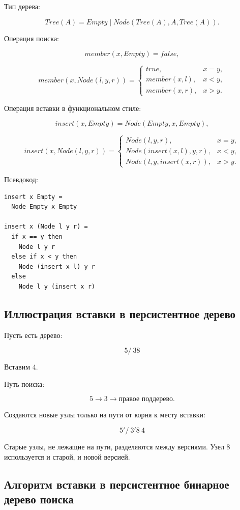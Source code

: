 \documentclass[12pt,a4paper]{article}
\begin{document}
Тип дерева:

\[
Tree(A) = Empty \mid Node(Tree(A), A, Tree(A)).
\]

Операция поиска:

\[
member(x, Empty) = false,
\]

\[
member(x, Node(l,y,r)) =
\begin{cases}
true, & x = y, \\
member(x,l), & x < y, \\
member(x,r), & x > y.
\end{cases}
\]

Операция вставки в функциональном стиле:

\[
insert(x, Empty) = Node(Empty,x,Empty),
\]

\[
insert(x, Node(l,y,r)) =
\begin{cases}
Node(l,y,r), & x = y, \\
Node(insert(x,l),y,r), & x < y, \\
Node(l,y,insert(x,r)), & x > y.
\end{cases}
\]

Псевдокод:

\begin{lstlisting}
insert x Empty =
  Node Empty x Empty

insert x (Node l y r) =
  if x == y then
    Node l y r
  else if x < y then
    Node (insert x l) y r
  else
    Node l y (insert x r)
\end{lstlisting}

\subsection{Иллюстрация вставки в персистентное дерево}

Пусть есть дерево:

\[
        5
       / \
      3   8
\]

Вставим $4$.

Путь поиска:

\[
5 \to 3 \to \text{правое поддерево}.
\]

Создаются новые узлы только на пути от корня к месту вставки:

\[
        5'
       /  \
      3'   8
        \
         4
\]

Старые узлы, не лежащие на пути, разделяются между версиями. Узел $8$ используется и старой, и новой версией.

\subsection{Алгоритм вставки в персистентное бинарное дерево поиска}
\end{document}
